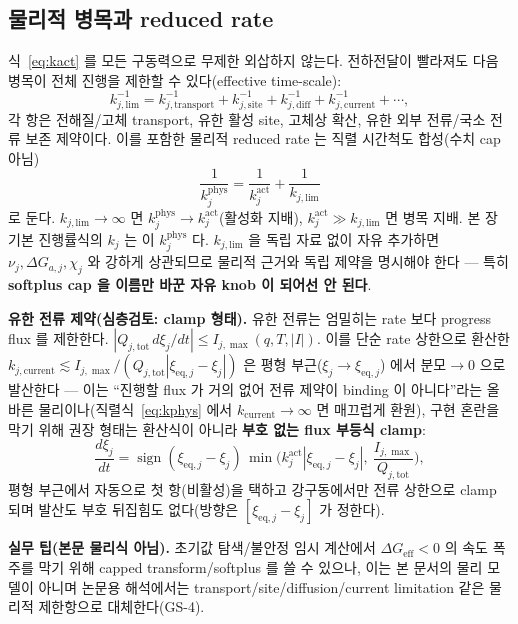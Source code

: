 \documentclass[11pt,a4paper]{article}
\newcommand{\eff}{\mathrm{eff}}
\newcommand{\eq}{\mathrm{eq}}
\newcommand{\tot}{\mathrm{tot}}
\begin{document}
\subsection{물리적 병목과 reduced rate}
식~\eqref{eq:kact} 를 모든 구동력으로 무제한 외삽하지 않는다. 전하전달이 빨라져도 다음 병목이 전체
진행을 제한할 수 있다(effective time-scale):
\begin{equation}
k_{j,\mathrm{lim}}^{-1}=k_{j,\mathrm{transport}}^{-1}+k_{j,\mathrm{site}}^{-1}+k_{j,\mathrm{diff}}^{-1}
+k_{j,\mathrm{current}}^{-1}+\cdots,
\label{eq:klim_comp}
\end{equation}
각 항은 전해질/고체 transport, 유한 활성 site, 고체상 확산, 유한 외부 전류/국소 전류 보존 제약이다.
이를 포함한 물리적 reduced rate 는 직렬 시간척도 합성(수치 cap 아님)
\begin{equation}
\boxed{\;\frac{1}{k_j^\mathrm{phys}}=\frac{1}{k_j^\mathrm{act}}+\frac{1}{k_{j,\mathrm{lim}}}\;}
\label{eq:kphys}
\end{equation}
로 둔다. $k_{j,\mathrm{lim}}\to\infty$ 면 $k_j^\mathrm{phys}\to k_j^\mathrm{act}$(활성화 지배),
$k_j^\mathrm{act}\gg k_{j,\mathrm{lim}}$ 면 병목 지배. 본 장 기본 진행률식의 $k_j$ 는 이
$k_j^\mathrm{phys}$ 다. $k_{j,\mathrm{lim}}$ 을 독립 자료 없이 자유 추가하면 $\nu_j,\Delta G_{a,j},\chi_j$
와 강하게 상관되므로 물리적 근거와 독립 제약을 명시해야 한다 — 특히 \textbf{softplus cap 을 이름만 바꾼
자유 knob 이 되어선 안 된다}.

\textbf{유한 전류 제약(심층검토: clamp 형태).} 유한 전류는 엄밀히는 rate 보다 progress flux 를 제한한다.
$|Q_{j,\tot}\,d\xi_j/dt|\le I_{j,\max}(q,T,|I|)$. 이를 단순 rate 상한으로 환산한
$k_{j,\mathrm{current}}\lesssim I_{j,\max}/(Q_{j,\tot}|\xi_{\eq,j}-\xi_j|)$ 은 평형 부근($\xi_j\to\xi_{\eq,j}$)
에서 분모$\to0$ 으로 발산한다 — 이는 ``진행할 flux 가 거의 없어 전류 제약이 binding 이 아니다''라는
올바른 물리이나(직렬식~\eqref{eq:kphys} 에서 $k_{\mathrm{current}}\to\infty$ 면 매끄럽게 환원), 구현
혼란을 막기 위해 권장 형태는 환산식이 아니라 \textbf{부호 없는 flux 부등식 clamp}:
\begin{equation}
\frac{d\xi_j}{dt}=\operatorname{sign}(\xi_{\eq,j}-\xi_j)\,
\min\!\Big(k_j^\mathrm{act}|\xi_{\eq,j}-\xi_j|,\ \frac{I_{j,\max}}{Q_{j,\tot}}\Big),
\label{eq:clamp}
\end{equation}
평형 부근에서 자동으로 첫 항(비활성)을 택하고 강구동에서만 전류 상한으로 clamp 되며 발산도 부호
뒤집힘도 없다(방향은 $[\xi_{\eq,j}-\xi_j]$ 가 정한다).
\begin{mdframed}
\textbf{실무 팁(본문 물리식 아님).} 초기값 탐색/불안정 임시 계산에서 $\Delta G_{\eff}<0$ 의 속도 폭주를
막기 위해 capped transform/softplus 를 쓸 수 있으나, 이는 본 문서의 물리 모델이 아니며 논문용 해석에서는
transport/site/diffusion/current limitation 같은 물리적 제한항으로 대체한다(GS-4).
\end{mdframed}
\end{document}
